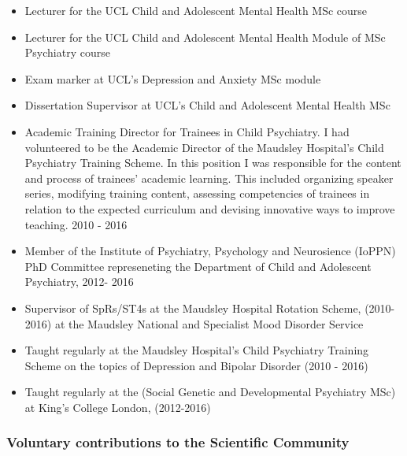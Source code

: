 \documentclass[
]{article}
\begin{document}
\begin{itemize}
\item
  Lecturer for the UCL Child and Adolescent Mental Health MSc course
\item
  Lecturer for the UCL Child and Adolescent Mental Health Module of MSc
  Psychiatry course
\item
  Exam marker at UCL's Depression and Anxiety MSc module
\item
  Dissertation Supervisor at UCL's Child and Adolescent Mental Health
  MSc
\item
  Academic Training Director for Trainees in Child Psychiatry. I had
  volunteered to be the Academic Director of the Maudsley Hospital's
  Child Psychiatry Training Scheme. In this position I was responsible
  for the content and process of trainees' academic learning. This
  included organizing speaker series, modifying training content,
  assessing competencies of trainees in relation to the expected
  curriculum and devising innovative ways to improve teaching. 2010 -
  2016
\item
  Member of the Institute of Psychiatry, Psychology and Neurosience
  (IoPPN) PhD Committee represeneting the Department of Child and
  Adolescent Psychiatry, 2012- 2016
\item
  Supervisor of SpRs/ST4s at the Maudsley Hospital Rotation Scheme,
  (2010-2016) at the Maudsley National and Specialist Mood Disorder
  Service
\item
  Taught regularly at the Maudsley Hospital's Child Psychiatry Training
  Scheme on the topics of Depression and Bipolar Disorder (2010 - 2016)
\item
  Taught regularly at the (Social Genetic and Developmental Psychiatry
  MSc) at King's College London, (2012-2016)
\end{itemize}

\hypertarget{voluntary-contributions-to-the-scientific-community}{%
\subsubsection{Voluntary contributions to the Scientific
Community}\label{voluntary-contributions-to-the-scientific-community}}
\end{document}
